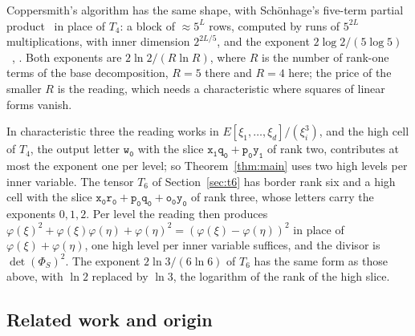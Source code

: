 \documentclass[11pt]{article}
\theoremstyle{definition}
\theoremstyle{remark}
\newcommand{\tl}[1]{\mathtt{#1}}
\begin{document}
Coppersmith's algorithm has the same shape, with Schönhage's five-term partial product~\cite{Sch81} in place of $T_4$: a block of $\approx5^L$ rows, computed by runs of $5^{2L}$ multiplications, with inner dimension $2^{2L/5}$, and the exponent $2\log2/(5\log5)$~\cite{Cop82}, \cite[Section~8]{Maj26}. Both exponents are $2\ln2/(R\ln R)$, where $R$ is the number of rank-one terms of the base decomposition, $R=5$ there and $R=4$ here; the price of the smaller $R$ is the reading, which needs a characteristic where squares of linear forms vanish.

In characteristic three the reading works in $E[\xi_1,\dots,\xi_d]/(\xi_i^3)$, and the high cell of $T_4$, the output letter $\tl{w_0}$ with the slice $\tl{x_1q_0}+\tl{p_0y_1}$ of rank two, contributes at most the exponent one per level; so Theorem~\ref{thm:main} uses two high levels per inner variable. The tensor $T_6$ of Section~\ref{sec:t6} has border rank six and a high cell with the slice $\tl{x_0r_0}+\tl{p_0q_0}+\tl{o_0y_0}$ of rank three, whose letters carry the exponents $0,1,2$. Per level the reading then produces $\varphi(\xi)^2+\varphi(\xi)\varphi(\eta)+\varphi(\eta)^2=(\varphi(\xi)-\varphi(\eta))^2$ in place of $\varphi(\xi)+\varphi(\eta)$, one high level per inner variable suffices, and the divisor is $\det(\Phi_S)^2$. The exponent $2\ln3/(6\ln6)$ of $T_6$ has the same form as those above, with $\ln2$ replaced by $\ln3$, the logarithm of the rank of the high slice.

\subsection{Related work and origin}
\end{document}
